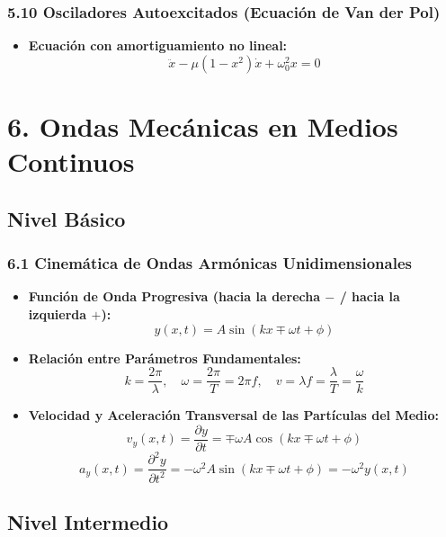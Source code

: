 \documentclass[11pt,a4paper]{article}
\begin{document}
\subsubsection*{5.10 Osciladores Autoexcitados (Ecuación de Van der Pol)}

\begin{itemize}
  \item \textbf{Ecuación con amortiguamiento no lineal:}
  \[
    \ddot{x} - \mu(1 - x^2)\dot{x} + \omega_0^2 x = 0
  \]
\end{itemize}

\section*{6. Ondas Mecánicas en Medios Continuos}

\subsection*{Nivel Básico}

\subsubsection*{6.1 Cinemática de Ondas Armónicas Unidimensionales}

\begin{itemize}
  \item \textbf{Función de Onda Progresiva (hacia la derecha $-$ / hacia la izquierda $+$):}
  \[
    y(x, t) = A \sin(k x \mp \omega t + \phi)
  \]
  \item \textbf{Relación entre Parámetros Fundamentales:}
  \[
    k = \frac{2\pi}{\lambda}, \quad \omega = \frac{2\pi}{T} = 2\pi f, \quad v = \lambda f = \frac{\lambda}{T} = \frac{\omega}{k}
  \]
  \item \textbf{Velocidad y Aceleración Transversal de las Partículas del Medio:}
  \[
    v_y(x, t) = \frac{\partial y}{\partial t} = \mp \omega A \cos(k x \mp \omega t + \phi)
  \]
  \[
    a_y(x, t) = \frac{\partial^2 y}{\partial t^2} = -\omega^2 A \sin(k x \mp \omega t + \phi) = -\omega^2 y(x, t)
  \]
\end{itemize}

\subsection*{Nivel Intermedio}
\end{document}

